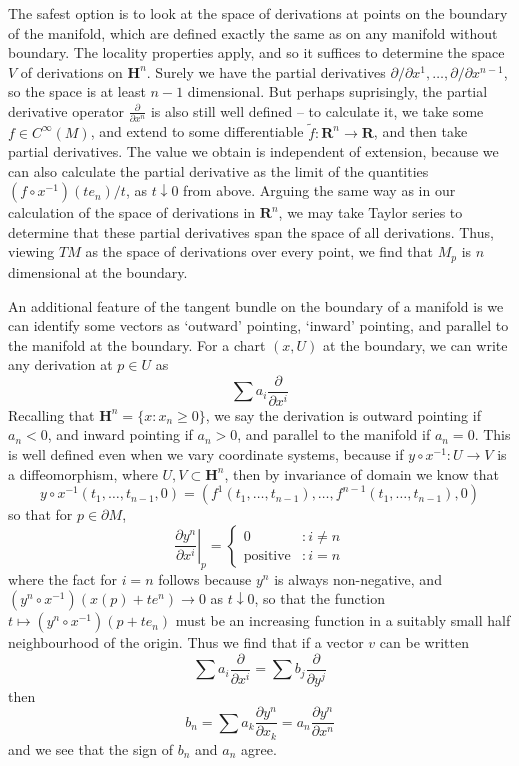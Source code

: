 The safest option is to look at the space of derivations at points on the boundary of the manifold, which are defined exactly the same as on any manifold without boundary. The locality properties apply, and so it suffices to determine the space $V$ of derivations on $\mathbf{H}^n$. Surely we have the partial derivatives $\partial/\partial x^1, \dots, \partial / \partial x^{n-1}$, so the space is at least $n-1$ dimensional. But perhaps suprisingly, the partial derivative operator $\frac{\partial}{\partial x^n}$ is also still well defined -- to calculate it, we take some $f \in C^\infty(M)$, and extend to some differentiable $\tilde{f}: \mathbf{R}^n \to \mathbf{R}$, and then take partial derivatives. The value we obtain is independent of extension, because we can also calculate the partial derivative as the limit of the quantities $(f \circ x^{-1})(te_n)/t$, as $t \downarrow 0$ from above. Arguing the same way as in our calculation of the space of derivations in $\mathbf{R}^n$, we may take Taylor series to determine that these partial derivatives span the space of all derivations. Thus, viewing $TM$ as the space of derivations over every point, we find that $M_p$ is $n$ dimensional at the boundary.

An additional feature of the tangent bundle on the boundary of a manifold is we can identify some vectors as `outward' pointing, `inward' pointing, and parallel to the manifold at the boundary. For a chart $(x,U)$ at the boundary, we can write any derivation at $p \in U$ as
%
\[ \sum a_i \frac{\partial}{\partial x^i} \]
%
Recalling that $\mathbf{H}^n = \{ x: x_n \geq 0 \}$, we say the derivation is outward pointing if $a_n < 0$, and inward pointing if $a_n > 0$, and parallel to the manifold if $a_n = 0$. This is well defined even when we vary coordinate systems, because if $y \circ x^{-1}: U \to V$ is a diffeomorphism, where $U,V \subset \mathbf{H}^n$, then by invariance of domain we know that
%
\[ y \circ x^{-1}(t_1, \dots, t_{n-1}, 0) = (f^1(t_1, \dots, t_{n-1}), \dots, f^{n-1}(t_1, \dots, t_{n-1}), 0) \]
%
so that for $p \in \partial M$,
%
\[ \left.\frac{\partial y^n}{\partial x^i}\right|_p = \begin{cases} 0 &: i \neq n \\ \text{positive} &: i = n \end{cases} \]
%
where the fact for $i = n$ follows because $y^n$ is always non-negative, and $(y^n \circ x^{-1})(x(p) + te^n) \to 0$ as $t \downarrow 0$, so that the function $t \mapsto (y^n \circ x^{-1})(p + te_n)$ must be an increasing function in a suitably small half neighbourhood of the origin. Thus we find that if a vector $v$ can be written
%
\[ \sum a_i \frac{\partial}{\partial x^i} = \sum b_j \frac{\partial}{\partial y^j} \]
%
then
%
\[ b_n = \sum a_k \frac{\partial y^n}{\partial x_k} = a_n \frac{\partial y^n}{\partial x^n} \]
%
and we see that the sign of $b_n$ and $a_n$ agree.

